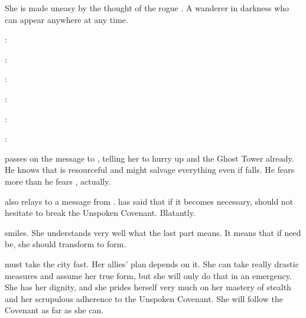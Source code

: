 She is made uneasy by the thought of the rogue \vertex. 
A wanderer in darkness who can appear anywhere at any time. 

\Takestsha:

\Psyrex:

\Takestsha:

\Psyrex:

\Takestsha:

\Psyrex:





\begin{comment}
  \section{\Psyrex tells \Nzessuacrith to hurry}
\end{comment}
\Psyrex passes on the message to \Nzessuacrith, telling her to hurry up and  the Ghost Tower already. 
He knows that \Achsah{} is resourceful and might salvage everything even if \Teshrial{} falls.
He fears \Achsah more than he fears \Teshrial, actually. 

\Psyrex also relays to \Nzessuacrith a message from \Secherdamon.
\Secherdamon has said that if it becomes necessary, \Nzessuacrith should not hesitate to break the Unspoken Covenant.
Blatantly.

\Nzessuacrith smiles. 
She understands very well what the last part means.
It means that if need be, she should transform to \draconian form. 

\Nzessuacrith must take the city fast.
Her allies' plan depends on it. 
She can take really drastic measures and assume her true form, but she will only do that in an emergency.
She has her dignity, and she prides herself very much on her mastery of stealth and her scrupulous adherence to the Unspoken Covenant. 
She will follow the Covenant as far as she can.

